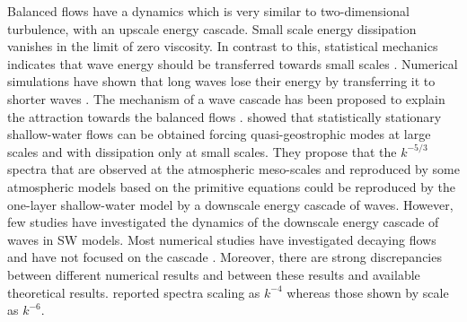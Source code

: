 \documentclass{jfm}
\begin{document}
Balanced flows have a dynamics which is very similar to
two-dimensional turbulence, with an upscale energy cascade. %
Small scale energy dissipation vanishes in the limit of zero
viscosity.
%
In contrast to this, statistical mechanics indicates that wave energy
should be transferred towards small scales \cite[]{Warn1986}.
Numerical simulations have shown that long waves lose their energy by
transferring it to shorter waves \cite[]{Sadourny1975,
FargeSadourny1989, YuanHamilton1994}.  The mechanism of a wave cascade
has been proposed to explain the attraction towards the balanced flows
\cite[]{Sadourny1975}.  \cite{YuanHamilton1994} showed that
statistically stationary shallow-water flows can be obtained forcing
quasi-geostrophic modes at large scales and with dissipation only at
small scales.
%
They propose that the $k^{-5/3}$ spectra that are observed at the
atmospheric meso-scales  \cite[]{NastromGage1985,LiLindborg2018}
and reproduced by some atmospheric models based on the primitive
equations \cite[]{KoshykHamilton2001, Skamarock2004,
Hamilton_etal2008} could be reproduced by the one-layer
shallow-water model by a downscale energy cascade of waves.
However, few studies have investigated the dynamics of the downscale
energy cascade of waves in SW models.
Most numerical studies have investigated decaying flows and have not
focused on the cascade \cite[]{FargeSadourny1989,
LarichevMcWilliams1991, SpallMcWilliams1992,
PolvaniMcWilliamsSpallFord1994, LahayeZeitlin2012}.
%
Moreover, there are strong discrepancies between different numerical
results and between these results and available theoretical results.
%
\cite{FargeSadourny1989} reported spectra scaling as $k^{-4}$
whereas those shown by \cite{LahayeZeitlin2012} scale as $k^{-6}$.
\end{document}
